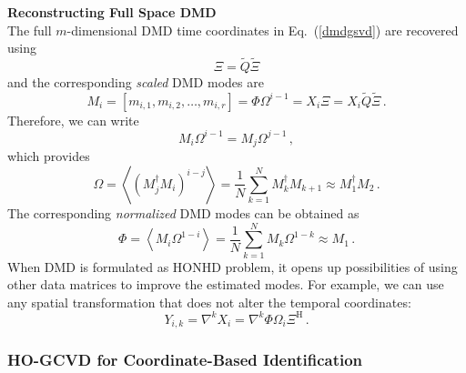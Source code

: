 \documentclass[10pt]{article}
\newcommand{\norm}[1]{\left\Vert#1\right\Vert}
\newcommand{\eq}[1]{Eq.\ (\ref{#1})}
\begin{document}
\noindent\textbf{Reconstructing Full Space DMD}\\
The full $m$-dimensional DMD time coordinates in \eq{dmdgsvd} are recovered using
\begin{equation}
    \Xi = \tilde Q \tilde \Xi
\end{equation}
and the corresponding {\em scaled} DMD modes are
\begin{equation}
    M_i = \left[m_{i,1}, m_{i,2},\ldots,m_{i,r}\right]=\Phi \Omega^{i-1} = X_i \Xi
 = X_i \tilde Q \tilde \Xi\,.
\end{equation}
Therefore, we can write
\begin{equation}
    M_i\Omega^{i-1} = M_j \Omega^{j-1}\,,
\end{equation}
which provides
\begin{equation}
    \Omega = \left\langle \left(M_j^\dag M_i\right)^{i-j}   \right\rangle = \frac{1}{N} \sum_{k=1}^N   M_{k}^\dag M_{k+1}\approx M_1^\dag M_2\,.
\end{equation}
The corresponding {\em normalized} DMD modes can be obtained as
\begin{equation}
\Phi = \left\langle M_i \Omega^{1-i} \right\rangle=\frac{1}{N} \sum_{k=1}^N   M_{k}\Omega^{1-k} \approx M_1\,.
\end{equation}
When DMD is formulated as HONHD problem, it opens up possibilities of using other data matrices to improve the estimated modes.
For example, we can use any spatial transformation that does not alter the temporal coordinates:
\begin{equation}
Y_{i,k} = \nabla^k X_i = \nabla^k \Phi \Omega_{i} \Xi^\mathrm{H}\,.
\end{equation}


\subsubsection{HO-GCVD for Coordinate-Based Identification}
\end{document}
